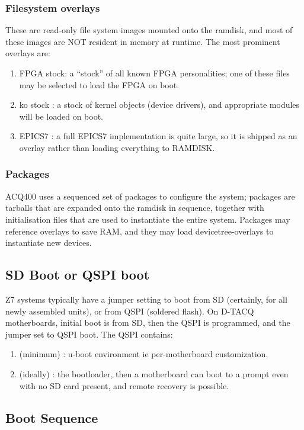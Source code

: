 \documentclass[]{article}
\begin{document}
\subsubsection{Filesystem overlays}
These are read-only file system images mounted onto the ramdisk, and most of these images are NOT resident in memory at runtime. The most prominent overlays are:
\begin{enumerate}
    \item FPGA stock: a “stock” of all known FPGA personalities; one of these files may be selected to load the FPGA on boot.
    \item ko stock : a stock of kernel objects (device drivers), and appropriate modules will be loaded on boot.
    \item EPICS7 : a full EPICS7 implementation is quite large, so it is shipped as an overlay rather than loading everything to RAMDISK.
\end{enumerate}

\subsubsection{Packages}
ACQ400 uses a sequenced set of packages to configure the system; packages are tarballs that are expanded onto the ramdisk in sequence, together with initialisation files that are used to instantiate the entire system. Packages may reference overlays to save RAM, and they may load devicetree-overlays to instantiate new devices.

\subsection{SD Boot or QSPI boot}
Z7 systems typically have a jumper setting to boot from SD (certainly, for all newly assembled units), or from QSPI (soldered flash). On D-TACQ motherboards, initial boot is from SD, then the QSPI is programmed, and the jumper set to QSPI boot.
The QSPI contains:
\begin{enumerate}
    \item (minimum) : u-boot environment ie per-motherboard customization.
    \item (ideally) : the bootloader, then a motherboard can boot to a prompt even with no SD card present, and remote recovery is possible.
\end{enumerate}

\subsection{Boot Sequence}
\end{document}

